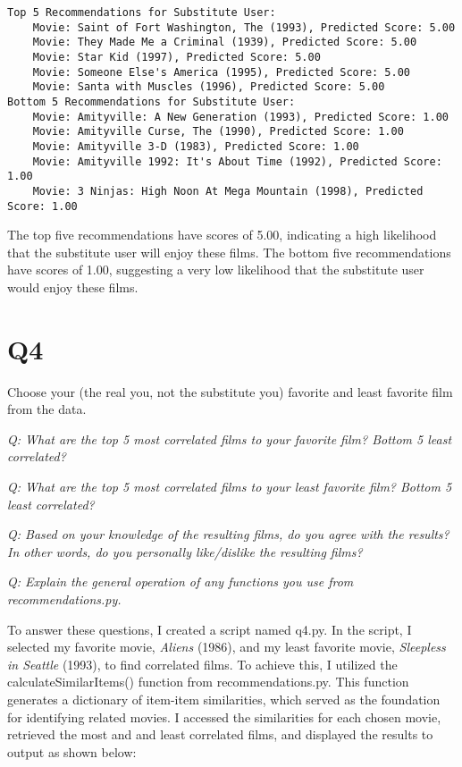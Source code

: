 \documentclass[12pt]{article}
\begin{document}
\begin{verbatim}
Top 5 Recommendations for Substitute User:
    Movie: Saint of Fort Washington, The (1993), Predicted Score: 5.00
    Movie: They Made Me a Criminal (1939), Predicted Score: 5.00
    Movie: Star Kid (1997), Predicted Score: 5.00
    Movie: Someone Else's America (1995), Predicted Score: 5.00
    Movie: Santa with Muscles (1996), Predicted Score: 5.00
Bottom 5 Recommendations for Substitute User:
    Movie: Amityville: A New Generation (1993), Predicted Score: 1.00
    Movie: Amityville Curse, The (1990), Predicted Score: 1.00
    Movie: Amityville 3-D (1983), Predicted Score: 1.00
    Movie: Amityville 1992: It's About Time (1992), Predicted Score: 1.00
    Movie: 3 Ninjas: High Noon At Mega Mountain (1998), Predicted Score: 1.00    
\end{verbatim}

The top five recommendations have scores of 5.00, indicating a high likelihood that the substitute user will enjoy these films. The bottom five recommendations have scores of 1.00, suggesting a very low likelihood that the substitute user would enjoy these films.

\section*{Q4}

Choose your (the real you, not the substitute you) favorite and least favorite film from the data.

\emph{Q: What are the top 5 most correlated films to your favorite film? Bottom 5 least correlated?}

\emph{Q: What are the top 5 most correlated films to your least favorite film? Bottom 5 least correlated?}

\emph{Q: Based on your knowledge of the resulting films, do you agree with the results? In other words, do you personally like/dislike the resulting films?}

\emph{Q: Explain the general operation of any functions you use from recommendations.py.}

To answer these questions, I created a script named q4.py. In the script, I selected my favorite movie, \emph{Aliens} (1986), and my least favorite movie, \emph{Sleepless in Seattle} (1993), to find correlated films. To achieve this, I utilized the calculateSimilarItems() function from recommendations.py. This function generates a dictionary of item-item similarities, which served as the foundation for identifying related movies. I accessed the similarities for each chosen movie, retrieved the most and and least correlated films, and displayed the results to output as shown below:
\end{document}
